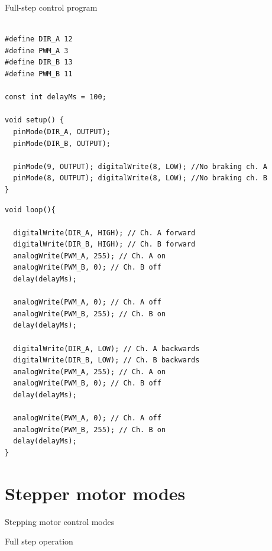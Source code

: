 \documentclass[compress]{beamer}
\begin{document}
\begin{frame}[fragile]{Full-step control program}
    \begin{overprint}
        \begin{verbatim}

#define DIR_A 12
#define PWM_A 3
#define DIR_B 13
#define PWM_B 11

const int delayMs = 100;

void setup() {
  pinMode(DIR_A, OUTPUT);
  pinMode(DIR_B, OUTPUT);

  pinMode(9, OUTPUT); digitalWrite(8, LOW); //No braking ch. A
  pinMode(8, OUTPUT); digitalWrite(8, LOW); //No braking ch. B
}

\end{verbatim}
\begin{verbatim}
void loop(){

  digitalWrite(DIR_A, HIGH); // Ch. A forward
  digitalWrite(DIR_B, HIGH); // Ch. B forward
  analogWrite(PWM_A, 255); // Ch. A on
  analogWrite(PWM_B, 0); // Ch. B off
  delay(delayMs);
  
  analogWrite(PWM_A, 0); // Ch. A off
  analogWrite(PWM_B, 255); // Ch. B on
  delay(delayMs);
  
  digitalWrite(DIR_A, LOW); // Ch. A backwards
  digitalWrite(DIR_B, LOW); // Ch. B backwards
  analogWrite(PWM_A, 255); // Ch. A on
  analogWrite(PWM_B, 0); // Ch. B off
  delay(delayMs);
  
  analogWrite(PWM_A, 0); // Ch. A off
  analogWrite(PWM_B, 255); // Ch. B on
  delay(delayMs);
}
\end{verbatim}
        \end{overprint}
\end{frame}


\section[Modes]{Stepper motor modes}

{
    \begin{frame}{Stepping motor control modes}
    \end{frame}
}
{
    \begin{frame}{Full step operation}
    \end{frame}
}
\end{document}
